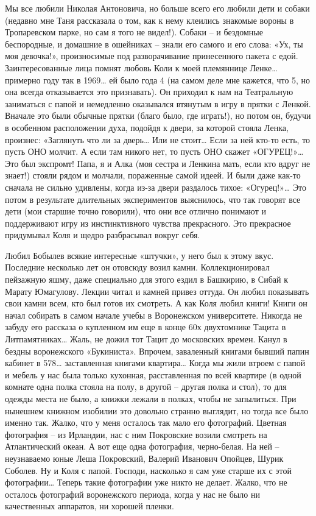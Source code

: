 Мы все любили Николая Антоновича, но больше всего его любили дети и собаки (недавно мне Таня рассказала о том, как к нему клеились знакомые вороны в Тропаревском парке, но сам я того не видел!). Собаки – и бездомные беспородные, и домашние в ошейниках – знали его самого и его слова: «Ух, ты моя девочка!», произносимые под разворачивание принесенного пакета с едой. Заинтересованные лица помнят любовь Коли к моей племяннице Ленке… примерно году так в 1969… ей было года 4 (на самом деле мне кажется, что 5, но она всегда отказывается это признавать). Он приходил к нам на Театральную заниматься с папой и немедленно оказывался втянутым в игру в прятки с Ленкой. Вначале это были обычные прятки (благо было, где играть!), но потом он, будучи в особенном расположении духа, подойдя к двери, за которой стояла Ленка, произнес: «Заглянуть что ли за дверь… Или не стоит… Если за ней кто-то есть, то пусть ОНО молчит. А если там никого нет, то пусть ОНО скажет «ОГУРЕЦ!»… Это был экспромт! Папа, я и Алка (моя сестра и Ленкина мать, если кто вдруг не знает!) стояли рядом и молчали, пораженные самой идеей. И были даже как-то сначала не сильно удивлены, когда из-за двери раздалось тихое: «Огурец!»… Это потом в результате длительных экспериментов выяснилось, что так говорят все дети (мои старшие точно говорили), что они все отлично понимают и поддерживают игру из инстинктивного чувства прекрасного. Это прекрасное придумывал Коля и щедро разбрасывал вокруг себя.

Любил Бобылев всякие интересные «штучки», у него был к этому вкус. Последние несколько лет он отовсюду возил камни. Коллекционировал пейзажную яшму, даже специально для этого ездил в Башкирию, в Сибай к Марату Юмагулову. Лекции читал и камней привез оттуда. Он любил показывать свои камни всем, кто был готов их смотреть. А как Коля любил книги! Книги он начал собирать в самом начале учебы в Воронежском университете. Никогда не забуду его рассказа о купленном им еще в конце 60х двухтомнике Тацита в Литпамятниках… Жаль, не дожил тот Тацит до московских времен. Канул в бездны воронежского «Букиниста». Впрочем, заваленный книгами бывший папин кабинет в 578… заставленная книгами квартира… Когда мы жили втроем с папой и мебель у нас была только кухонная, расставленная по всей квартире (в одной комнате одна полка стояла на полу, в другой – другая полка и стол), то для одежды места не было, а книжки лежали в полках, чтобы не запылиться. При нынешнем книжном изобилии это довольно странно выглядит, но тогда все было именно так.	
Жалко, что у меня осталось так мало его фотографий. Цветная фотография – из Ирландии, нас с ним Покровские возили смотреть на Атлантический океан. А вот еще одна фотография, черно-белая. На ней – неузнаваемо юные Леша Покровский, Валерий Иванович Опойцев, Шурик Соболев. Ну и Коля с папой. Господи, насколько я сам уже старше их с этой фотографии… Теперь такие фотографии уже никто не делает. Жалко, что не осталось фотографий воронежского периода, когда у нас не было ни качественных аппаратов, ни хорошей пленки.	

